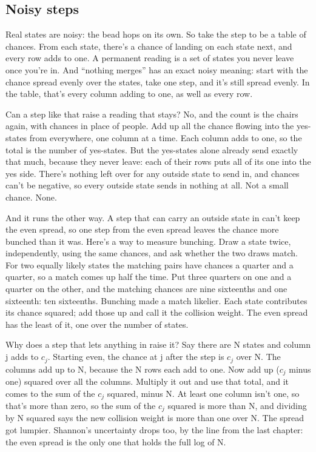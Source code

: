 \documentclass[11pt,twoside]{article}
\theoremstyle{thielethm}
\theoremstyle{thieledef}
\theoremstyle{thieledef}
\theoremstyle{thieledef}
\theoremstyle{thielethm}
\theoremstyle{thieleobs}
\theoremstyle{thielethm}
\begin{document}
\subsection{Noisy steps}

Real states are noisy: the bead hops on its own. So take the step to be a table of chances. From each state, there's a chance of landing on each state next, and every row adds to one. A permanent reading is a set of states you never leave once you're in. And ``nothing merges'' has an exact noisy meaning: start with the chance spread evenly over the states, take one step, and it's still spread evenly. In the table, that's every column adding to one, as well as every row.

Can a step like that raise a reading that stays? No, and the count is the chairs again, with chances in place of people. Add up all the chance flowing into the yes-states from everywhere, one column at a time. Each column adds to one, so the total is the number of yes-states. But the yes-states alone already send exactly that much, because they never leave: each of their rows puts all of its one into the yes side. There's nothing left over for any outside state to send in, and chances can't be negative, so every outside state sends in nothing at all. Not a small chance. None.

And it runs the other way. A step that can carry an outside state in can't keep the even spread, so one step from the even spread leaves the chance more bunched than it was. Here's a way to measure bunching. Draw a state twice, independently, using the same chances, and ask whether the two draws match. For two equally likely states the matching pairs have chances a quarter and a quarter, so a match comes up half the time. Put three quarters on one and a quarter on the other, and the matching chances are nine sixteenths and one sixteenth: ten sixteenths. Bunching made a match likelier. Each state contributes its chance squared; add those up and call it the collision weight. The even spread has the least of it, one over the number of states.

Why does a step that lets anything in raise it? Say there are N states and column j adds to $c_j$. Starting even, the chance at j after the step is $c_j$ over N. The columns add up to N, because the N rows each add to one. Now add up ($c_j$ minus one) squared over all the columns. Multiply it out and use that total, and it comes to the sum of the $c_j$ squared, minus N. At least one column isn't one, so that's more than zero, so the sum of the $c_j$ squared is more than N, and dividing by N squared says the new collision weight is more than one over N. The spread got lumpier. Shannon's uncertainty drops too, by the line from the last chapter: the even spread is the only one that holds the full log of N.
\end{document}
